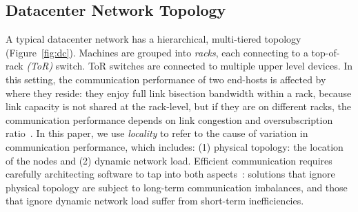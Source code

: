 \subsection{Datacenter Network Topology}
\label{sec:datacenternetwork}
A typical datacenter network has a hierarchical, multi-tiered topology~\cite{Mysore2009PortLandAS,VL2,Roy2015InsideTS,incbricks} (Figure~\ref{fig:dc}). Machines are grouped into \textit{racks}, each connecting to a top-of-rack \textit{(ToR)} switch. ToR switches are connected to multiple upper level devices. In this setting, the communication performance of two end-hosts is affected by where they reside: they enjoy full link bisection bandwidth within a rack, because link capacity is not shared at the rack-level, but if they are on different racks, the communication performance depends on link congestion and oversubscription ratio~\cite{Bilal2012ACS}. In this paper, we use \textit{locality} to refer to the cause of variation in communication performance, which includes: (1) physical topology: the location of the nodes and (2) dynamic network load. Efficient communication requires carefully architecting software to tap into both aspects~\cite{eyeQ, 27Octobe15:online}: solutions that ignore physical topology are subject to long-term communication imbalances, and those that ignore dynamic network load suffer from short-term inefficiencies.